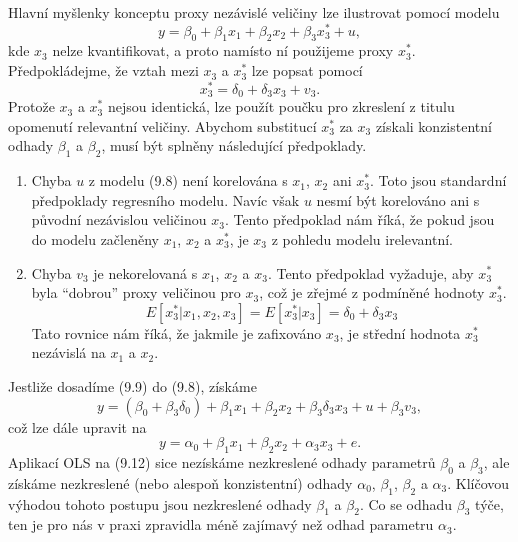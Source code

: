 Hlavní myšlenky konceptu proxy nezávislé veličiny lze ilustrovat pomocí modelu
\begin{equation}
y = \beta_0 + \beta_1 x_1 + \beta_2 x_2 + \beta_3 x_3^* + u,
\end{equation}
kde $x_3$ nelze kvantifikovat, a proto namísto ní použijeme proxy $x_3^*$. Předpokládejme, že vztah mezi $x_3$ a $x_3^*$ lze popsat pomocí 
\begin{equation}
x_3^* = \delta_0 + \delta_3 x_3 + v_3.
\end{equation}
Protože $x_3$ a $x_3^*$ nejsou identická, lze použít poučku pro zkreslení z titulu opomenutí relevantní veličiny. Abychom substitucí $x_3^*$ za $x_3$ získali konzistentní odhady $\beta_1$ a $\beta_2$, musí být splněny následující předpoklady.
\begin{enumerate}
\item Chyba $u$ z modelu (9.8) není korelována s $x_1$, $x_2$ ani $x_3^*$. Toto jsou standardní předpoklady regresního modelu. Navíc však $u$ nesmí být korelováno ani s původní nezávislou veličinou $x_3$. Tento předpoklad nám říká, že pokud jsou do modelu začleněny $x_1$, $x_2$ a $x_3^*$, je $x_3$ z pohledu modelu irelevantní.
\item Chyba $v_3$ je nekorelovaná s $x_1$, $x_2$ a $x_3$. Tento předpoklad vyžaduje, aby $x_3^*$ byla ``dobrou'' proxy veličinou pro $x_3$, což je zřejmé z podmíněné hodnoty $x_3^*$.
\begin{equation}
E[x_3^* | x_1, x_2, x_3] = E[x_3^* | x_3] = \delta_0 + \delta_3 x_3
\end{equation}
Tato rovnice nám říká, že jakmile je zafixováno $x_3$, je střední hodnota $x_3^*$ nezávislá na $x_1$ a $x_2$.
\end{enumerate}
Jestliže dosadíme (9.9) do (9.8), získáme
\begin{equation}
y = (\beta_0 + \beta_3 \delta_0) + \beta_1 x_1 + \beta_2 x_2 + \beta_3 \delta_3 x_3 + u + \beta_3 v_3,
\end{equation}
což lze dále upravit na
\begin{equation}
y = \alpha_0 + \beta_1 x_1 + \beta_2 x_2 + \alpha_3 x_3 + e.
\end{equation}
Aplikací OLS na (9.12) sice nezískáme nezkreslené odhady parametrů $\beta_0$ a $\beta_3$, ale získáme nezkreslené (nebo alespoň konzistentní) odhady $\alpha_0$, $\beta_1$, $\beta_2$ a $\alpha_3$. Klíčovou výhodou tohoto postupu jsou nezkreslené odhady $\beta_1$ a $\beta_2$. Co se odhadu $\beta_3$ týče, ten je pro nás v praxi zpravidla méně zajímavý než odhad parametru $\alpha_3$.


